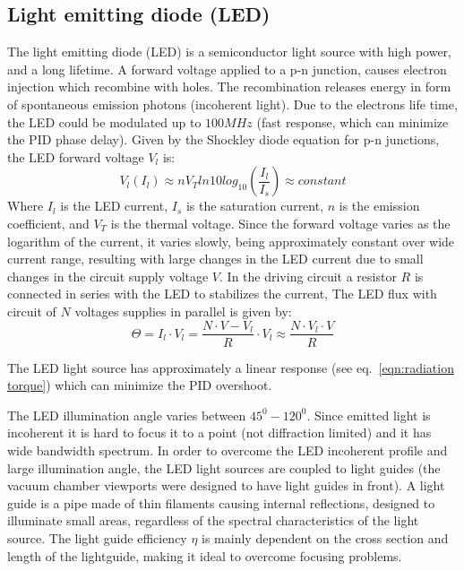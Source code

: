 \documentclass[\main/master.tex]{subfiles}
\begin{document}
\subsection{Light emitting diode (LED)}
The light emitting diode (LED) is a semiconductor light source with high power, and a long lifetime. A forward voltage applied to a p-n junction, causes electron injection which recombine with holes. The recombination releases energy in form of spontaneous emission photons (incoherent light). Due to the electrons life time, the LED could be modulated up to $100MHz$ (fast response, which can minimize the PID phase delay). Given by the Shockley diode equation for p-n junctions, the LED forward voltage $V_l$ is:
\begin{equation}
V_l(I_l) \approx n V_T ln10 log_{10} (\frac{I_l}{I_s})\approx constant \label{eqn:led voltage}
\end{equation}
Where $I_l$ is the LED current, $I_s$ is the saturation current, $n$ is the emission coefficient, and $V_T$ is the thermal voltage. Since the forward voltage varies as the logarithm of the current, it varies slowly, being approximately constant over wide current range, resulting with large changes in the LED current due to small changes in the circuit supply voltage $V$. In the driving circuit a resistor $R$ is connected in series with the LED to stabilizes the current, The LED flux with circuit of $N$ voltages supplies in parallel is given by:
\begin{equation}
\Theta = I_l\cdot V_l  =\frac{N\cdot V-V_l}{R}\cdot V_l\approx \frac{N\cdot V_l\cdot V}{R}\label{eqn:led power}
\end{equation}
\par\noindent
The LED light source has approximately a linear response (see eq.~\ref{eqn:radiation torque}) which can minimize the PID overshoot.
\par\noindent
The LED illumination angle varies between $45^0-120^0$. Since emitted light is incoherent it is hard to focus it to a point (not diffraction limited) and it has wide bandwidth spectrum. In order to overcome the LED incoherent profile and large illumination angle, the LED light sources are coupled to light guides (the vacuum chamber viewports were designed to have light guides in front). A light guide is a pipe made of thin filaments causing internal reflections, designed to illuminate small areas, regardless of the spectral characteristics of the light source. The light guide efficiency $\eta$ is mainly dependent on the cross section and length of the lightguide, making it ideal to overcome focusing problems. 
\end{document}
